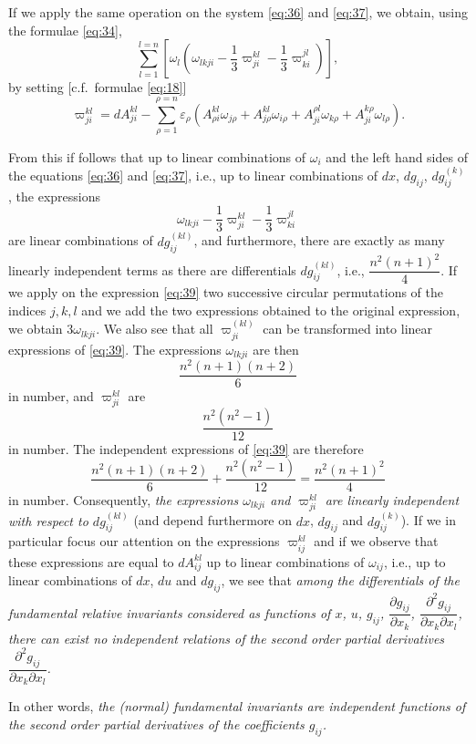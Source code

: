 \documentclass[leqno,12pt]{article}
\makeatletter
\let\old@epsilon\epsilon
\let\old@varepsilon\varepsilon
\let\epsilon\old@varepsilon
\let\varepsilon\old@epsilon
\newcommand{\pd}{\partial}
\theoremstyle{shape1}
\theoremstyle{shape0}
\theoremstyle{shape2}
\theoremstyle{definition}
\makeatother
\begin{document}
If we apply the same operation on the system \eqref{eq:36} and \eqref{eq:37}, we obtain, using the formulae \eqref{eq:34},
\[
\sum_{l=1}^{l=n}\left[\omega_{l}\left(\omega_{lkji}-\frac{1}{3}\varpi^{kl}_{ji}-\frac{1}{3}\varpi^{jl}_{ki}\right)\right],
\]
by setting [c.f.\ formulae \eqref{eq:18}]
\[
\varpi^{kl}_{ji}=dA^{kl}_{ji}-\sum_{\rho=1}^{\rho=n}\epsilon_{\rho}(A^{kl}_{\rho i}\omega_{j\rho}+A^{kl}_{j\rho}\omega_{i \rho}+A^{\rho l}_{ji}\omega_{k\rho}+A^{k\rho}_{ji}\omega_{l\rho}).
\]

From this if follows that up to linear combinations of $\omega_{i}$ and the left hand sides of the equations \eqref{eq:36} and \eqref{eq:37}, i.e., up to linear combinations of $dx$, $dg_{ij}$, $dg_{ij}^{(k)}$, the expressions
\begin{equation}
  \label{eq:39}
  \omega_{lkji}-\frac{1}{3}\varpi^{kl}_{ji}-\frac{1}{3}\varpi^{jl}_{ki}
\end{equation}
are linear combinations of $dg_{ij}^{(kl)}$, and furthermore, there are exactly as many linearly independent terms as there are differentials $dg_{ij}^{(kl)}$, i.e., $\dfrac{n^{2}(n+1)^{2}}{4}$. If we apply on the expression \eqref{eq:39} two successive circular permutations of the indices $j,k,l$ and we add the two expressions obtained to the original expression, we obtain $3\omega_{lkji}$. We also see that all $\varpi^{(kl)}_{ji}$ can be transformed into linear expressions of \eqref{eq:39}. The expressions $\omega_{lkji}$ are then
\[
\frac{n^{2}(n+1)(n+2)}{6}
\]
in number, and $\varpi^{kl}_{ji}$ are 
\[
\frac{n^{2}(n^{2}-1)}{12}
\]
in number. The independent expressions of \eqref{eq:39} are therefore
\[
\frac{n^{2}(n+1)(n+2)}{6}+\frac{n^{2}(n^{2}-1)}{12}=\frac{n^{2}(n+1)^{2}}{4}
\]
in number. Consequently, \emph{the expressions $\omega_{lkji}$ and $\varpi^{kl}_{ji}$ are linearly independent with respect to $dg_{ij}^{(kl)}$} (and depend furthermore on $dx$, $dg_{ij}$ and $dg_{ij}^{(k)}$). If we in particular focus our attention on the expressions $\varpi^{kl}_{ij}$ and if we observe that these expressions are equal to $dA^{kl}_{ij}$ up to linear combinations of $\omega_{ij}$, i.e., up to linear combinations of $dx$, $du$ and $dg_{ij}$, we see that \emph{among the differentials of the fundamental relative invariants considered as functions of $x$, $u$, $g_{ij}$, $\dfrac{\pd g_{ij}}{\pd x_{k}}$, $\dfrac{\pd ^{2}g_{ij}}{\pd x_{k}\pd x_{l}}$, there can exist no independent relations of the second order partial derivatives $\dfrac{\pd^{2}g_{ij}}{\pd x_{k}\pd x_{l}}$.}

In other words, \emph{the (normal) fundamental invariants are independent functions of the second order partial derivatives of the coefficients $g_{ij}$.}
\end{document}
